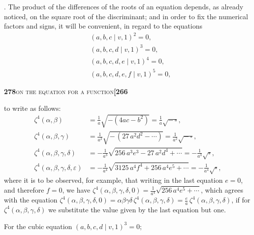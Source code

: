 \documentclass[11pt]{article}
\newcommand{\Cdel}{\mid}
\begin{document}
\medskip

. The product of the differences of the roots of an equation depends, as already noticed, on the square root of the discriminant; and in order to fix the numerical factors and signs, it will be convenient, in regard to the equations
\[
\begin{aligned}
   & (a, b, c \Cdel v, 1)^2 = 0,\\
   & (a, b, c, d \Cdel v, 1)^3 = 0,\\
   & (a, b, c, d, e \Cdel v, 1)^4 = 0,\\
   & (a, b, c, d, e, f \Cdel v, 1)^5 = 0,
\end{aligned}
\]

\newpage
\setcounter{page}{278}

\noindent\textbf{278}\hfill\textsc{on the equation for a function}\hfill\textbf{[266}

\medskip

\noindent to write as follows:
\[
\begin{aligned}
   \zeta^4(\alpha, \beta) &= \tfrac{1}{a}\sqrt{-(4ac - b^2)} = \tfrac{1}{a}\sqrt{-\,\square},\\[3pt]
   \zeta^4(\alpha, \beta, \gamma) &= \tfrac{1}{a^2}\sqrt{-\,(27\,a^2 d^2 - \cdots)} = \tfrac{1}{a^2}\sqrt{-\,\square},\\[3pt]
   \zeta^4(\alpha, \beta, \gamma, \delta) &= -\tfrac{1}{a^3}\sqrt{256\,a^3 e^3 - 27\,a^2 d^4 + \cdots} = -\tfrac{1}{a^3}\sqrt{\square},\\[3pt]
   \zeta^4(\alpha, \beta, \gamma, \delta, \varepsilon) &= -\tfrac{1}{a^4}\sqrt{3125\,a^4 f^4 + 256\,a^4 e^5 + \cdots} = -\tfrac{1}{a^4}\sqrt{\square},
\end{aligned}
\]
where it is to be observed, for example, that writing in the last equation $e = 0$, and therefore $f = 0$, we have $\zeta^4(\alpha, \beta, \gamma, \delta, 0) = \tfrac{1}{a^4}\sqrt{256\,a^4 e^5 + \cdots}$, which agrees with the equation $\zeta^4(\alpha, \beta, \gamma, \delta, 0) = \alpha\beta\gamma\delta\,\zeta^4(\alpha, \beta, \gamma, \delta) = \tfrac{e}{a}\,\zeta^4(\alpha, \beta, \gamma, \delta)$, if for $\zeta^4(\alpha, \beta, \gamma, \delta)$ we substitute the value given by the last equation but one.

\medskip

\noindent For the cubic equation $(a, b, c, d \Cdel v, 1)^3 = 0$;

\medskip
\end{document}
